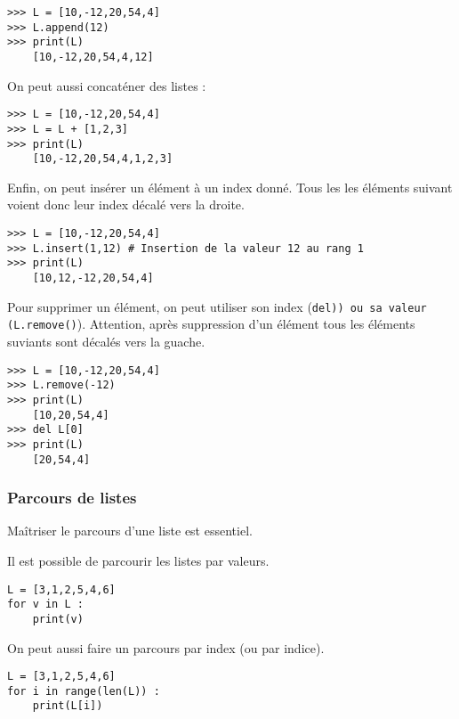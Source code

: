 \begin{lstlisting}
>>> L = [10,-12,20,54,4]
>>> L.append(12)
>>> print(L)
    [10,-12,20,54,4,12]
\end{lstlisting}

On peut aussi concaténer des listes :
\begin{lstlisting}
>>> L = [10,-12,20,54,4]
>>> L = L + [1,2,3]
>>> print(L)
    [10,-12,20,54,4,1,2,3]
\end{lstlisting}


Enfin, on peut insérer un élément à un index donné. Tous les les éléments suivant voient donc leur index décalé vers la droite.  
\begin{lstlisting}
>>> L = [10,-12,20,54,4]
>>> L.insert(1,12) # Insertion de la valeur 12 au rang 1
>>> print(L)
    [10,12,-12,20,54,4]
\end{lstlisting}


Pour supprimer un élément, on peut utiliser son index (\lstinline(del)) ou sa valeur (\lstinline{(L.remove()}). Attention, après suppression d'un élément tous les éléments suviants sont décalés vers la guache.  
\begin{lstlisting}
>>> L = [10,-12,20,54,4]
>>> L.remove(-12)
>>> print(L)
    [10,20,54,4]
>>> del L[0]
>>> print(L)
    [20,54,4]
\end{lstlisting}


\subsubsection{Parcours de listes}

\newcommand{\heart}{\ensuremath\heartsuit}


   

Maîtriser le parcours d'une liste est essentiel.


\begin{minipage}[c]{.47\linewidth}
Il est possible de parcourir les listes par valeurs. 
\begin{lstlisting}
L = [3,1,2,5,4,6]
for v in L : 
    print(v)
\end{lstlisting}
\end{minipage}
\hfill
\begin{minipage}[c]{.47\linewidth}
On peut aussi faire un parcours par index (ou par indice).
\begin{lstlisting}
L = [3,1,2,5,4,6]
for i in range(len(L)) : 
    print(L[i])
\end{lstlisting}
\end{minipage}


